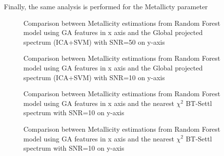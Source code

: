{ 

Finally, the same analysis is performed for the Metallicty parameter

\begin {figure}
 \begin{center}
 \caption{Comparison between Metallicity estimations from 
 Random Forest model using GA features  in x axis and 
 the Global projected spectrum (ICA+SVM) with SNR=50 on y-axis}
 \label{fig:Mbp_Mga_50}
 \end{center}
\end {figure}

\begin {figure}
 \begin{center}
 \caption{Comparison between Metallicity estimations from 
 Random Forest model using GA features  in x axis and 
 the Global projected spectrum (ICA+SVM) with SNR=10 on y-axis}
 \label{fig:Mbp_Mga_10}
 \end{center}
\end {figure}

\begin {figure}
 \begin{center}
 \caption{Comparison between Metallicity estimations from 
 Random Forest model using GA features  in x axis and 
 the nearest $\chi^2$ BT-Settl spectrum with SNR=10 on y-axis}
 \label{fig:Mch_Mga_50}
 \end{center}
\end {figure}

\begin {figure}
 \begin{center}
 \caption{Comparison between Metallicity estimations from 
 Random Forest model using GA features  in x axis and 
 the nearest $\chi^2$ BT-Settl spectrum with SNR=10 on y-axis}
 \label{fig:Mch_Mga_10}
 \end{center}
\end {figure}

}

